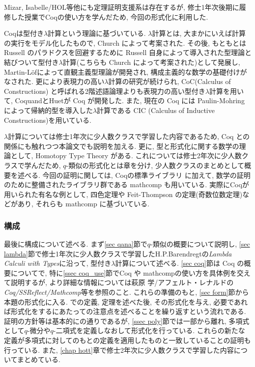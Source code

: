 \documentclass[11pt]{jsreport}
\theoremstyle{mystyle}
\newcommand{\0}{\textbf{0}}
\begin{document}
Mizar, Isabelle/HOL等他にも定理証明支援系は存在するが, 修士1年次後期に履修した授業でCoqの使い方を学んだため, 今回の形式化に利用した. 

Coqは型付き$\lambda$計算という理論に基づいている. $\lambda$計算とは, 大まかにいえば計算の実行をモデル化したもので, Church によって考案された. その後, もともとは Russell のパラドクスを回避するために Russell 自身によって導入された型理論と結びついて型付き$\lambda$計算(こちらも Church によって考案された)として発展し, Martin-L\"{o}fによって直観主義型理論が開発され, 構成主義的な数学の基礎付けがなされた. 更により表現力の高い$\lambda$計算の研究が続けられ, CoC(Calculus of Constructions) と呼ばれる2階述語論理よりも表現力の高い型付き$\lambda$計算を用いて, CoquandとHuetが Coq が開発した. また, 現在の Coq には Paulin-Mohring によって帰納的型を導入した$\lambda$計算である CIC (Calculus of Inductive Constructions)を用いている. 

$\lambda$計算については修士1年次に少人数クラスで学習した内容であるため, Coq との関係にも触れつつ本論文でも説明を加える. 更に, 型と形式化に関する数学の理論として, Homotopy Type Theory がある. これについては修士2年次に少人数クラスで学んだため, $q$-類似の形式化とは章を分け, 少人数クラスのまとめとして概要を述べる. 今回の証明に関しては, Coqの標準ライブラリ \cite{coq sl}に加えて, 数学の証明のために整備されたライブラリ群である mathcomp \cite{coq mc}も用いている. 
実際にCoqが用いられた有名な例として, 四色定理や Feit-Thompson の定理(奇数位数定理)などがあり, それらも mathcomp に基づいている. 
\subsubsection*{構成}
最後に構成について述べる. 
まず\ref{sec qana}節で$q$-類似の概要について説明し, 
\ref{sec lambda}節で修士1年次に少人数クラスで学習したH.P.Barendregtの{\it Lambda Calculi with Types}\cite{Bar}に沿って, 型付き$\lambda$計算について述べる. 
\ref{sec coq}節は Coq の概要についてで, 特に\ref{ssec coq_use}節でCoq や mathcompの使い方を具体例を交えて説明するが, より詳細な情報については萩原 学/アフェルト・レナルドの{\it Coq/SSReflect/Mathcomp}\cite{Hag}等を参照のこと. 
これらの準備のもと, \ref{sec form}節から本題の形式化に入る. \cite{Kac}での定義, 定理を述べた後, その形式化を与え, 必要であれば形式化をするにあたっての注意点を述べることを繰り返すという流れである. 
証明の方針等は基本的に\cite{Kac}の通りであるが, \ref{ssec poly}節では一部\cite{Kac}から離れ, 多項式として$q$-微分や$q$-二項式を定義しなおして形式化を行っている. これらの新たな定義が多項式に対してのもとの定義を適用したものと一致していることの証明も行っている. また, \ref{chap hott}章で修士2年次に少人数クラスで学習した内容についてまとめている. 
\end{document}
